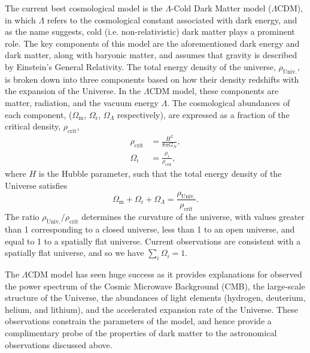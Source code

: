 The current best cosmological model is the $\Lambda$-Cold Dark Matter model ($\Lambda$CDM), in which $\Lambda$ refers to the cosmological constant associated with dark energy, and as the name suggests, cold (i.e. non-relativistic) dark matter plays a prominent role. The key components of this model are the aforementioned dark energy and dark matter, along with baryonic matter, and assumes that gravity is described by Einstein's General Relativity. The total energy density of the universe, $\rho_\mathrm{Univ.}$, is broken down into three components based on how their density redshifts with the expansion of the Universe. In the $\Lambda$CDM model, these components are matter, radiation, and the vacuum energy $\Lambda$. The cosmological abundances of each component, ($\Omega_\mathrm{m}$, $\Omega_\mathrm{r}$, $\Omega_\Lambda$ respectively), are expressed as a fraction of the critical density, $\rho_\mathrm{crit}$,     
\begin{align}
    \rho_\mathrm{crit}   & = \frac{H^2}{8 \pi G_N},\\
    \Omega_i & = \frac{\rho_i}{\rho_\mathrm{crit}},
\end{align}
where $H$ is the Hubble parameter, such that the total energy density of the Universe satisfies
\begin{equation}
    \Omega_\mathrm{m} + \Omega_\mathrm{r} + \Omega_\Lambda = \frac{\rho_\mathrm{Univ.}}{\rho_\mathrm{crit}}.
\end{equation}
The ratio $\rho_\mathrm{Univ.}/\rho_\mathrm{crit}$ determines the curvature of the universe, with values greater than 1 corresponding to a closed universe, less than 1 to an open universe, and equal to 1 to a spatially flat universe. Current observations are consistent with a spatially flat universe, and so we have $\sum_i \Omega_i = 1$.


The $\Lambda$CDM model has seen huge success as it provides explanations for observed the power spectrum of the Cosmic Microwave Background (CMB), the large-scale structure of the Universe, the abundances of light elements (hydrogen, deuterium, helium, and lithium), and the accelerated expansion rate of the Universe. These observations constrain the parameters of the model, and hence provide a complimentary probe of the properties of dark matter to the astronomical observations discussed above.

